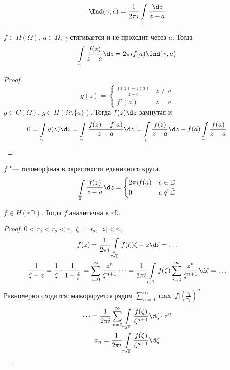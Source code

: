 \begin{conseq}
	\[ \Ind(\gamma, a) = \frac1{2\pi i} \int\limits_\gamma \frac{\d z}{z-a} \]
\end{conseq}

\begin{theorem}
	$f \in H(\Omega)$, $a \in \Omega$, $\gamma$ стягивается и не проходит через $a$.
	Тогда
	\[ \int\limits_\gamma \frac{f(z)}{z-a} \d z = 2\pi i f(a) \Ind(\gamma, a) \]
\end{theorem}
\begin{proof}
	\[ g(z) = \begin{cases} \frac{f(z) - f(a)}{z-a} & z \ne a \\ f'(a) & z = a \end{cases} \]
	$g \in C(\Omega)$, $g \in H(\Omega \setminus \{a\})$.
	Тогда $f(z) \d z$ замнутая и
	\begin{gather*}
		0 = \int\limits_\gamma g(z) \d z
		= \int\limits_\gamma \frac{f(z) - f(a)}{z - a} \d z
		= \int\limits_\gamma \frac{f(z)}{z-a} \d z - f(a) \int\limits_\gamma \frac{f(a)}{z - a}
	\end{gather*}
\end{proof}

\begin{conseq}
	$f$ "--- голоморфная в окрестности единичного круга.
	\[
		\int\limits_{\mathbb T} \frac{f(z)}{z - a} \d z = \begin{cases}
			2\pi i f(a) & a \in \mathbb D \\
			0 & a \notin \bar {\mathbb D}
		\end{cases}
	\]
\end{conseq}

\begin{theorem}
	$f \in H(r\mathbb D)$.
	Тогда $f$ аналитична в $r\mathbb D$.
\end{theorem}

\begin{proof}
	$0 < r_1 < r_2 < r$, $|\zeta| = r_2$, $|z| < r_2$.
	\begin{gather*}
		f(z) = \frac1{2\pi i} \int\limits_{r_2\mathbb T} f(\zeta){\zeta - z} \d \zeta = \dots \\
		\frac1{\zeta - z} = \frac1\zeta \cdot \frac1{1- \frac z\zeta} = \sum_{i=0}^\infty \frac{z^n}{\zeta^{n+1}}
		\dots = \frac1{2\pi i} \int\limits_{r_2 \mathbb T} f(\zeta) \sum_{i=0}^\infty \frac{z^n}{\zeta^{n+1}} \d \zeta = \dots
	\end{gather*}
	Равномерно сходится: мажорируется рядом $\sum_{n=0}^\infty \max |f| \left(\frac{r_1}{r_2}\right)^n$
	\begin{gather*}
		\dots = \frac1{2\pi i} \sum_{n=0}^\infty \int\limits_{r_2 \mathbb T} \frac{f(\zeta)}{\zeta^{n+1}} \d \zeta \cdot z^n \\
		a_n = \frac1{2\pi i} \int\limits_{r_2 \mathbb T} \frac{f(\zeta)}{\zeta^{n+1}} \d \zeta
	\end{gather*}
\end{proof}

